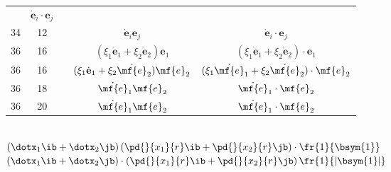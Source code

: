 \documentclass[a4paper,11pt]{article}
\begin{document}
\begin{center}
\begin{tabular}{|c|c|c|c|c|}
           & $\dot{ \mathbf{ e } }_{ i } \cdot \mathbf{ e }_{ j }$ \\
    34  & 12 & & $\dot{ \mathbf{ e } }_{ i } \mathbf{ e }_{ j }$
           & $\dot{ \mathbf{ e } }_{ i } \cdot \mathbf{ e }_{ j }$ \\
    36  & 16 & & $( \xi_{ 1 } \dot{ \mathbf{ e } }_{ 1 } + \xi_{ 2 }
                 \dot{ \mathbf{ e } }_{ 2 }  ) \mathbf{ e }_{ 1 }$
           & $( \xi_{ 1 } \dot{ \mathbf{ e } }_{ 1 } + \xi_{ 2 }
             \dot{ \mathbf{ e } }_{ 2 }  ) \cdot \mathbf{ e }_{ 1 }$ \\
    36  & 16 & & $( \xi_{ 1 } \dot{ \mathbf{ e } }_{ 1 } + \xi_{ 2 }
                 \dot{ \mf{ e } }_{ 2 }  ) \mf{ e }_{ 2 }$
           & $( \xi_{ 1 } \dot{ \mf{ e } }_{ 1 } + \xi_{ 2 }
             \dot{ \mf{ e } }_{ 2 }  ) \cdot \mf{ e }_{ 2 }$ \\
    36  & 18 & & $\dot{ \mf{ e } }_{ 1 } \mf{ e }_{ 2 }$
           & $\dot{ \mf{ e } }_{ 1 } \cdot \mf{ e }_{ 2 }$ \\
    36  & 20 & & $\dot{ \mf{ e } }_{ 1 } \mf{ e }_{ 2 }$
           & $\dot{ \mf{ e } }_{ 1 } \cdot \mf{ e }_{ 2 }$ \\
    \hline
  \end{tabular}
\end{center}
\noi
{} \\
\Jest
$( \dotx_{ 1 } \ib + \dotx_{ 2 } \jb ) \left( \pd{}{ x_{ 1 } }{ r }
  \ib + \pd{}{ x_{ 2 } }{ r } \jb \right)
\cdot \fr{ 1 }{ \bsym{ 1 } }$ \\
\Pow
$( \dotx_{ 1 } \ib + \dotx_{ 2 } \jb ) \cdot \left( \pd{}{ x_{ 1 } }{
    r } \ib + \pd{}{ x_{ 2 } }{ r } \jb \right)
\fr{ 1 }{ | \bsym{ 1 } | }$ \\

\vspace{\spaceTwo}





 {}



\end{document}
